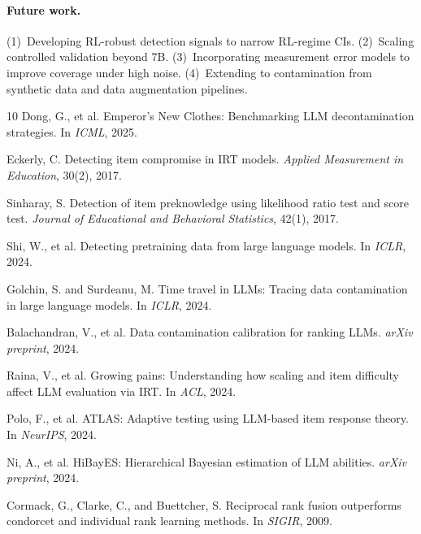 \documentclass[letterpaper,11pt]{article}
\begin{document}
\paragraph{Future work.}
(1)~Developing RL-robust detection signals to narrow RL-regime CIs.
(2)~Scaling controlled validation beyond 7B.
(3)~Incorporating measurement error models to improve coverage under high noise.
(4)~Extending to contamination from synthetic data and data augmentation pipelines.

\begin{thebibliography}{10}
Dong, G., et al.
\newblock Emperor's New Clothes: Benchmarking LLM decontamination strategies.
\newblock In \emph{ICML}, 2025.

Eckerly, C.
\newblock Detecting item compromise in IRT models.
\newblock \emph{Applied Measurement in Education}, 30(2), 2017.

Sinharay, S.
\newblock Detection of item preknowledge using likelihood ratio test and score test.
\newblock \emph{Journal of Educational and Behavioral Statistics}, 42(1), 2017.

Shi, W., et al.
\newblock Detecting pretraining data from large language models.
\newblock In \emph{ICLR}, 2024.

Golchin, S. and Surdeanu, M.
\newblock Time travel in LLMs: Tracing data contamination in large language models.
\newblock In \emph{ICLR}, 2024.

Balachandran, V., et al.
\newblock Data contamination calibration for ranking LLMs.
\newblock \emph{arXiv preprint}, 2024.

Raina, V., et al.
\newblock Growing pains: Understanding how scaling and item difficulty affect LLM evaluation via IRT.
\newblock In \emph{ACL}, 2024.

Polo, F., et al.
\newblock ATLAS: Adaptive testing using LLM-based item response theory.
\newblock In \emph{NeurIPS}, 2024.

Ni, A., et al.
\newblock HiBayES: Hierarchical Bayesian estimation of LLM abilities.
\newblock \emph{arXiv preprint}, 2024.

Cormack, G., Clarke, C., and Buettcher, S.
\newblock Reciprocal rank fusion outperforms condorcet and individual rank learning methods.
\newblock In \emph{SIGIR}, 2009.
\end{thebibliography}
\end{document}
